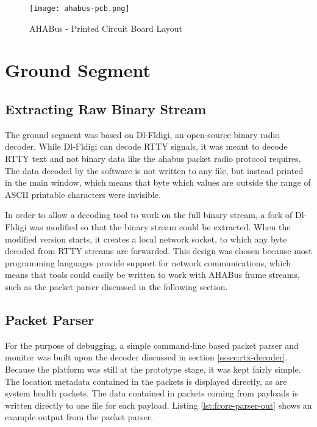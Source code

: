\begin{figure}[H]
\texttt{[image: ahabus-pcb.png]}
\centering
\caption{AHABus - Printed Circuit Board Layout}
\label{fig:ahabus-pcb}
\end{figure}

\section{Ground Segment}
\label{sec:ground-segment}

\subsection{Extracting Raw Binary Stream}
\label{sec:binary-extraction}

The ground segment was based on Dl-Fldigi, an open-source binary radio decoder.
While Dl-Fldigi can decode RTTY signals, it was meant to decode RTTY text and
not binary data like the \acrshort{ahabus} packet radio protocol requires.
The data decoded by the software is not written to any file, but instead printed
in the main window, which means that byte which values are outside the range of
ASCII printable characters were invisible.

In order to allow a decoding tool to work on the full binary stream, a fork of
Dl-Fldigi was modified so that the binary stream could be extracted. When the
modified version starts, it creates a local network socket, to which any
byte decoded from RTTY streams are forwarded. This design was chosen because
most programming languages provide support for network communications, which
means that tools could easily be written to work with AHABus frame streams, such
as the packet parser discussed in the following section.

\subsection{Packet Parser}
\label{sec:packet-dispatcher}

For the purpose of debugging, a simple command-line based packet parser and
monitor was built upon the decoder discussed in section
\ref{sssec:rtx-decoder}. Because the platform was still at the prototype stage,
it was kept fairly simple. The location metadata contained in the packets is
displayed directly, as are system health packets. The data contained in packets
coming from payloads is written directly to one file for each payload. Listing
\ref{lst:fcore-parser-out} shows an example output from the packet parser.

